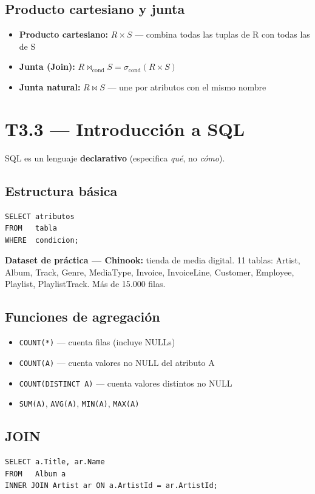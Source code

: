 \documentclass[12pt, a4paper]{article}
\begin{document}
\subsection{Producto cartesiano y junta}
\begin{itemize}
  \item \textbf{Producto cartesiano:} $R \times S$ — combina todas las tuplas de R con todas las de S
  \item \textbf{Junta (Join):} $R \bowtie_{\text{cond}} S = \sigma_{\text{cond}}(R \times S)$
  \item \textbf{Junta natural:} $R \bowtie S$ — une por atributos con el mismo nombre
\end{itemize}

\section{T3.3 — Introducción a SQL}

SQL es un lenguaje \textbf{declarativo} (especifica \textit{qué}, no \textit{cómo}).

\subsection{Estructura básica}
\begin{lstlisting}
SELECT atributos
FROM   tabla
WHERE  condicion;
\end{lstlisting}

\textbf{Dataset de práctica — Chinook:} tienda de media digital. 11 tablas: Artist, Album, Track, Genre, MediaType, Invoice, InvoiceLine, Customer, Employee, Playlist, PlaylistTrack. Más de 15.000 filas.

\subsection{Funciones de agregación}
\begin{itemize}
  \item \texttt{COUNT(*)} — cuenta filas (incluye NULLs)
  \item \texttt{COUNT(A)} — cuenta valores no NULL del atributo A
  \item \texttt{COUNT(DISTINCT A)} — cuenta valores distintos no NULL
  \item \texttt{SUM(A)}, \texttt{AVG(A)}, \texttt{MIN(A)}, \texttt{MAX(A)}
\end{itemize}

\subsection{JOIN}
\begin{lstlisting}
SELECT a.Title, ar.Name
FROM   Album a
INNER JOIN Artist ar ON a.ArtistId = ar.ArtistId;
\end{lstlisting}
\end{document}
